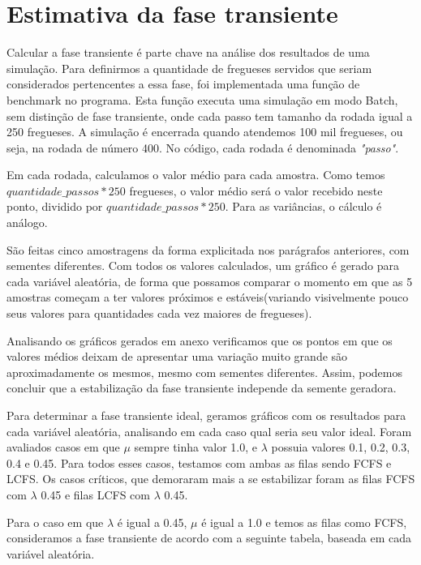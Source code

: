 \documentclass[a4paper,10pt]{article}
\begin{document}
\pagebreak

\section{Estimativa da fase transiente}

    Calcular a fase transiente é parte chave na análise dos resultados de uma simulação. Para definirmos a quantidade de fregueses servidos que seriam considerados pertencentes a essa fase, foi implementada uma função de benchmark no programa. Esta função executa uma simulação em modo Batch, sem distinção de fase transiente, onde cada passo tem tamanho da rodada igual a 250 fregueses. A simulação é encerrada quando atendemos 100 mil fregueses, ou seja, na rodada de número 400. No código, cada rodada é denominada \emph{"passo"}.

    Em cada rodada, calculamos o valor médio para cada amostra. Como temos $quantidade\_passos * 250$ fregueses, o valor médio será o valor recebido neste ponto, dividido por $quantidade\_passos * 250$. Para as variâncias, o cálculo é análogo.

    São feitas cinco amostragens da forma explicitada nos parágrafos anteriores, com sementes diferentes. Com todos os valores calculados, um gráfico é gerado para cada variável aleatória, de forma que possamos comparar o momento em que as 5 amostras começam a ter valores próximos e estáveis(variando visivelmente pouco seus valores para quantidades cada vez maiores de fregueses).

    Analisando os gráficos gerados em anexo verificamos que os pontos em que os valores médios deixam de apresentar uma variação muito grande são aproximadamente os mesmos, mesmo com sementes diferentes. Assim, podemos concluir que a estabilização da fase transiente independe da semente geradora.

    Para determinar a fase transiente ideal, geramos gráficos com os resultados para cada variável aleatória, analisando em cada caso qual seria seu valor ideal. Foram avaliados casos em que $\mu$ sempre tinha valor 1.0, e $\lambda$ possuia valores 0.1, 0.2, 0.3, 0.4 e 0.45. Para todos esses casos, testamos com ambas as filas sendo FCFS e LCFS. Os casos críticos, que demoraram mais a se estabilizar foram as filas FCFS com $\lambda$ 0.45 e filas LCFS com $\lambda$ 0.45.

    Para o caso em que $\lambda$ é igual a 0.45, $\mu$ é igual a 1.0 e temos as filas como FCFS, consideramos a fase transiente de acordo com a seguinte tabela, baseada em cada variável aleatória.
\end{document}
